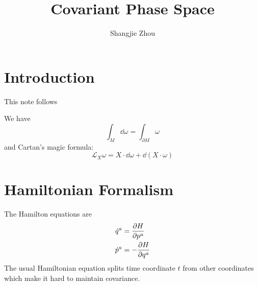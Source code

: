 \documentclass[10pt]{article}
\begin{document}
\title{Covariant Phase Space}
\author{Shangjie Zhou}
\maketitle
{}
\section*{Introduction}
This note follows \cite{Harlow:2019yfa}

We have
\begin{equation}\label{eq:stokes}
    \int_M\dd{\omega}=\int_{\partial M}\omega
\end{equation}
and Cartan's magic formula:
\begin{equation}\label{eq:cartan}
    \mathcal{L}_X \omega=X\cdot\dd{\omega}+\dd{(X\cdot\omega)}
\end{equation}
\section{Hamiltonian Formalism}
The Hamilton equations are
\begin{subequations}
    \begin{align}
        \dot{q}^a & =\pdv{H}{p^a}  \\
        \dot{p}^a & =-\pdv{H}{q^a}
    \end{align}
\end{subequations}
The usual Hamiltonian equation splits time coordinate $t$ from other coordinates which make it hard to maintain covariance.
\end{document}
